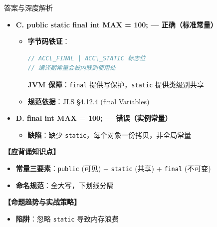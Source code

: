 ﻿\documentclass[12pt, a4paper]{ctexart}
\newcommand{\code}[1]{\texttt{#1}}
\begin{document}
\begin{enumerate}[label=\arabic*., itemsep=1.5em]
\begin{bluebox}{答案与深度解析}
\begin{itemize}[leftmargin=*, nosep]
			      \item \textbf{C. public static final int MAX = 100; — 正确（标准常量）}
			            \begin{itemize}[leftmargin=*, nosep]
				            \item \textbf{字节码铁证}：
				                  \begin{lstlisting}[language=Java]
// ACC\_FINAL | ACC\_STATIC 标志位
// 编译期常量会被内联到使用处
                \end{lstlisting}
				                  \textbf{JVM 保障}：\code{final} 提供写保护，\code{static} 提供类级别共享
				            \item \textbf{规范依据}：JLS §4.12.4 (final Variables)
			            \end{itemize}

			      \item \textbf{D. final int MAX = 100; — 错误（实例常量）}
			            \begin{itemize}[leftmargin=*, nosep]
				            \item \textbf{缺陷}：缺少 \code{static}，每个对象一份拷贝，非全局常量
			            \end{itemize}
		      \end{itemize}

		      \textbf{【应背诵知识点】}
		      \begin{itemize}[leftmargin=*, nosep]
			      \item \textbf{常量三要素}：\code{public} (可见) + \code{static} (共享) + \code{final} (不可变)
			      \item \textbf{命名规范}：全大写，下划线分隔
		      \end{itemize}

		      \textbf{【命题趋势与实战策略】}
		      \begin{itemize}[leftmargin=*, nosep]
			      \item \textbf{陷阱}：忽略 \code{static} 导致内存浪费
		      \end{itemize}
	      \end{bluebox}



\end{enumerate}
\end{document}
